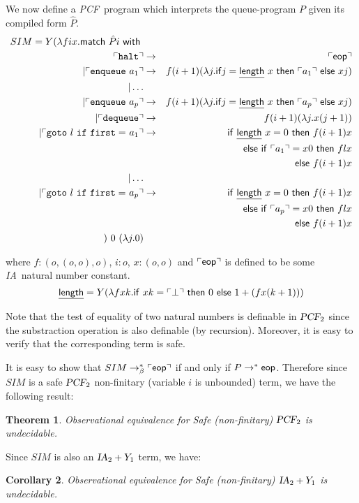 \documentclass{article}
\newcommand\eop{{\sf eop}}
\newcommand{\betared}{\rightarrow_\beta}
\newcommand{\encode}[1]{\ulcorner #1 \urcorner}
\newcommand\ialgol{{\textsl{IA}}}
\newcommand\pcf{\textsl{PCF}}
\newtheorem{theorem}{Theorem}[section]
\newtheorem{corollary}[theorem]{Corollary}
\begin{document}
We now define a \pcf\ program which interprets the queue-program $P$ given  its compiled form $\hat{P}$.
\begin{eqnarray*}
SIM = Y ( \lambda f i x . {\sf match\ } \hat{P} i  {\sf \ with\ }   \\
 \encode{ \tt halt }&\rightarrow& \encode{\eop} \\
| \encode{ {\tt enqueue\ } a_1 } &\rightarrow& f (i+1) ( \lambda j . {\sf if} j = \underline{\sf length}\ x\ {\sf then\ } \encode{a_1} {\sf\ else\ } x j ) \\
| \ldots \\
| \encode{ {\tt enqueue\ } a_p } &\rightarrow& f (i+1) ( \lambda j . {\sf if} j = \underline{\sf length}\ x\ {\sf then\ } \encode{a_p} {\sf\ else\ } x j ) \\
| \encode{ {\tt dequeue } } &\rightarrow& f (i+1) (\lambda j . x (j+1) ) \\
| \encode{ {\tt goto\ } l {\tt\ if\ first=\ } a_1 } &\rightarrow&  
{\sf if\ } \underline{\sf length}\ x = 0 {\ \sf then\ } f (i+1) x \\
&&{\sf else\ if\ } \encode{a_1} = x 0 {\sf\ then\ } f l x \\
&&{\sf else\ } f (i+1) x \\
| \ldots \\
| \encode{{\tt goto\ } l {\tt\ if\ first=\ } a_p} &\rightarrow&  
{\sf if\ } \underline{\sf length}\ x = 0 {\ \sf then\ } f (i+1) x \\
&&{\sf else\ if\ } \encode{a_p} = x 0 {\sf\ then\ } f l x \\
&&{\sf else\ } f (i+1) x \\
)\ 0\ (\lambda j . 0)
\end{eqnarray*}

where $f: (o,(o,o),o)$, $i:o$, $x:(o,o)$ and $\encode{\eop}$ is defined to be some \ialgol\ natural number constant.
$$ \underline{\sf  length}  = Y( \lambda f x k . {\sf if\ } x k = \encode{\bot} {\sf\ then\ } 0 {\sf\ else\ } 1 + (f x (k+1)))$$

Note that the test of equality of two natural numbers is definable in $\pcf_2$ since the substraction operation is  also definable (by recursion). Moreover, it is easy to verify that the corresponding term is safe.


It is easy to show that $SIM \betared^* \encode{\eop}$ if and only if $P \rightarrow^* \eop$. Therefore since $SIM$ is a safe $\pcf_2$ 
non-finitary (variable $i$ is unbounded) term, we have the following result:
\begin{theorem}
Observational equivalence for Safe (non-finitary) $\pcf_2$ is undecidable.
\end{theorem}
Since $SIM$ is also an $\ialgol_2 + Y_1$ term, we have:
\begin{corollary}
Observational equivalence for Safe (non-finitary) $\ialgol_2 + Y_1$ is undecidable.
\end{corollary}
\end{document}
